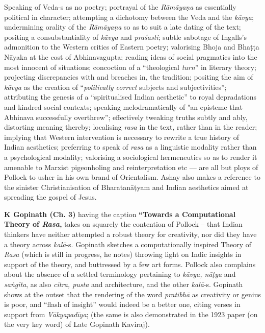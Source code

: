 Speaking of Veda-s as no poetry; portrayal of the \textsl{Rāmāyaṇa} as essentially political in character; attempting a dichotomy between the Veda and the \textsl{kāvya}; undermining orality of the \textsl{Rāmāyaṇa} so as to suit a late dating of the text; positing a consubstantiality of \textsl{kāvya} and \textsl{praśasti}; subtle sabotage of Ingalls's admonition to the Western critics of Eastern poetry; valorising Bhoja and Bhaṭṭa Nāyaka at the cost of Abhinavagupta; reading ideas of social pragmatics into the most innocent of situations; concoction of a “theological \textsl{turn}” in literary theory; projecting discrepancies with and breaches in, the tradition; positing the aim of \textsl{kāvya} as the creation of “\textsl{politically correct} subjects and subjectivities''; attributing the genesis of a “spiritualised Indian aesthetic” to royal depradations and kindred social contexts; speaking melodramatically of "an episteme that Abhinava successfully overthrew”; effectively tweaking truths subtly and ably, distorting meaning thereby; localising \textsl{rasa} in the text, rather than in the reader; implying that Western intervention is necessary to rewrite a true history of Indian aesthetics; preferring to speak of \textsl{rasa} as a linguistic modality rather than a psychological modality; valorising a sociological hermeneutics so as to render it amenable to Marxist pigeonholing and reinterpretation etc --- are all but ploys of Pollock to usher in his own brand of Orientalism. Ashay also makes a reference to the sinister Christianisation of Bharatanāṭyam and Indian aesthetics aimed at spreading the gospel of Jesus.

{\bf K Gopinath (Ch. 3)} having the caption {\bf “Towards a Computational Theory of {\sl\bfseries Rasa},} takes on squarely the contention of Pollock -- that Indian thinkers have neither attempted a robust theory for creativity, nor did they have a theory across \textsl{kalā}-s. Gopinath sketches a computationally inspired Theory of \textsl{Rasa} (which is still in progress, he notes) throwing light on Indic insights in support of the theory, and buttressed by a few art forms. Pollock also complains about the absence of a settled terminology pertaining to \textsl{kāvya, nāṭya} and \textsl{saṅgīta}, as also \textsl{citra, pusta} and architecture, and the other \textsl{kalā}-s. Gopinath shows at the outset that the rendering of the word \textsl{pratibhā} as creativity or genius is poor, and “flash of insight” would indeed be a better one, citing verses in support from \textsl{Vākyapadīya}; (the same is also demonstrated in the 1923 paper (on the very key word) of Late Gopinath Kaviraj).


